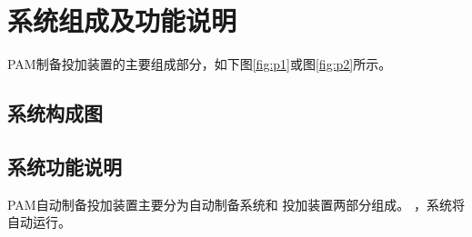 









\usepackage{textcomp}





\tableofcontents %

\newpage %

\section{系统组成及功能说明}

   PAM制备投加装置的主要组成部分，如下图\ref{fig:p1}或图\ref{fig:p2}所示。
   \subsection{系统构成图}

   

\newpage %

   

   \subsection{系统功能说明}
      PAM自动制备投加装置主要分为自动制备系统和 投加装置两部分组成。
      ，系统将自动运行。
